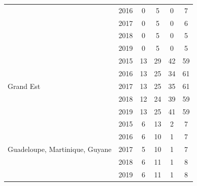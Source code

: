 \begin{table}[hb]
{\begin{tabular}{l|c|cccc}
   & 2016 &   0 &   5 &   0 &   7 \\ 
   & 2017 &   0 &   5 &   0 &   6 \\ 
   & 2018 &   0 &   5 &   0 &   5 \\ 
   & 2019 &   0 &   5 &   0 &   5 \\ 
  \hline
  \multirow{5}{*}{Grand Est}    & 2015 &  13 &  29 &  42 &  59 \\ 
   & 2016 &  13 &  25 &  34 &  61 \\ 
   & 2017 &  13 &  25 &  35 &  61 \\ 
   & 2018 &  12 &  24 &  39 &  59 \\ 
   & 2019 &  13 &  25 &  41 &  59 \\
  \hline
  \multirow{5}{*}{Guadeloupe, Martinique, Guyane}    & 2015 &   6 &  13 &   2 &   7 \\ 
   & 2016 &   6 &  10 &   1 &   7 \\ 
   & 2017 &   5 &  10 &   1 &   7 \\ 
   & 2018 &   6 &  11 &   1 &   8 \\ 
   & 2019 &   6 &  11 &   1 &   8 \\ 
  \hline
\end{tabular}
}
\end{table}

